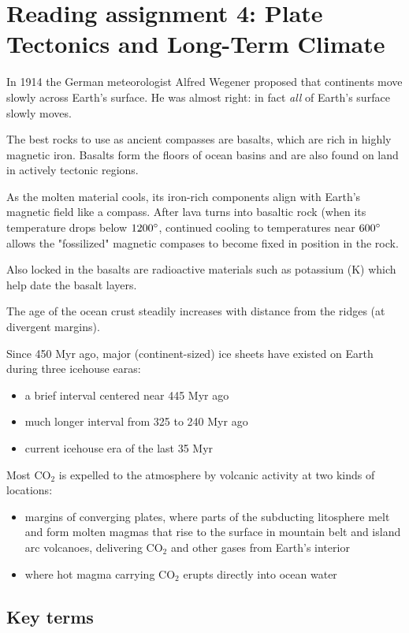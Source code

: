 \section{Reading assignment 4: Plate Tectonics and Long-Term Climate}

In 1914 the German meteorologist Alfred Wegener proposed that continents move
slowly across Earth's surface. He was almost right: in fact \textit{all} of
Earth's surface slowly moves.

The best rocks to use as ancient compasses are basalts, which are rich in
highly magnetic iron. Basalts form the floors of ocean basins and are also
found on land in actively tectonic regions.

As the molten material cools, its iron-rich components align with Earth's
magnetic field like a compass. After lava turns into basaltic rock (when its
temperature drops below $1200 \degree$, continued cooling to temperatures near
$600 \degree$ allows the "fossilized" magnetic compases to become fixed in
position in the rock.

Also locked in the basalts are radioactive materials such as potassium (K)
which help date the basalt layers.

The age of the ocean crust steadily increases with distance from the ridges
(at divergent margins).

Since 450 Myr ago, major (continent-sized) ice sheets have existed on Earth
during three icehouse earas:
\begin{itemize}
	\item a brief interval centered near 445 Myr ago
	\item much longer interval from 325 to 240 Myr ago
	\item current icehouse era of the last 35 Myr
\end{itemize}

Most CO$_2$ is expelled to the atmosphere by volcanic activity at two kinds of
locations:

\begin{itemize}
	\item margins of converging plates, where parts of the subducting
	litosphere melt and form molten magmas that rise to the surface in
	mountain belt and island arc volcanoes, delivering CO$_2$ and other
	gases from Earth's interior
	\item where hot magma carrying CO$_2$ erupts directly into ocean water
\end{itemize}

\subsection{Key terms}

